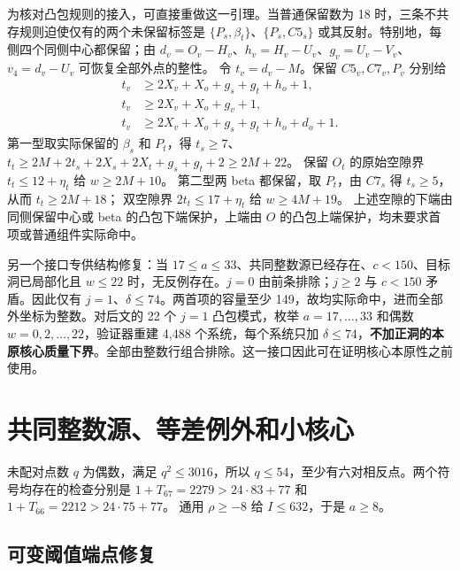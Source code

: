 \documentclass[11pt,a4paper]{article}
\begin{document}
为核对凸包规则的接入，可直接重做这一引理。当普通保留数为 18
时，三条不共存规则迫使仅有的两个未保留标签是
\(\{P_s,\beta_t\}\)、\(\{P_s,C5_s\}\)
或其反射。特别地，每侧四个同侧中心都保留；由
\(d_v=O_v-H_v\)、\(h_v=H_v-U_v\)、\(g_v=U_v-V_v\)、\(v_4=d_v-U_v\)
可恢复全部外点的整性。 令 \(t_v=d_v-M\)。保留 \(C5_v,C7_v,P_v\) 分别给
\[
\begin{aligned}
 t_v&\ge2X_v+X_o+g_s+g_t+h_o+1,\\
 t_v&\ge2X_v+X_o+g_v+1,\\
 t_v&\ge2X_v+X_o+g_s+g_t+h_o+d_o+1.
\end{aligned}
\] 第一型取实际保留的 \(\beta_s\) 和 \(P_t\)，得 \(t_s\ge7\)、
\(t_t\ge2M+2t_s+2X_s+2X_t+g_s+g_t+2\ge2M+22\)。 保留 \(O_t\)
的原始空隙界 \(t_t\le12+\eta_t\) 给 \(w\ge2M+10\)。 第二型两 beta
都保留，取 \(P_t\)，由 \(C7_s\) 得 \(t_s\ge5\)，从而 \(t_t\ge2M+18\)；
双空隙界 \(2t_t\le17+\eta_t\) 给 \(w\ge4M+19\)。
上述空隙的下端由同侧保留中心或 beta 的凸包下端保护，上端由 \(O\)
的凸包上端保护，均未要求首项或普通组件实际命中。

另一个接口专供结构修复：当
\(17\le a\le33\)、共同整数源已经存在、\(c<150\)、目标洞已局部化且
\(w\le22\) 时，无反例存在。\(j=0\) 由前条排除；\(j\ge2\) 与 \(c<150\)
矛盾。因此仅有 \(j=1\)、\(\delta\le74\)。两首项的容量至少
149，故均实际命中，进而全部外坐标为整数。对后文的 22 个 \(j=1\)
凸包模式，枚举 \(a=17,\ldots,33\) 和偶数 \(w=0,2,\ldots,22\)，验证器重建
4,488 个系统，每个系统只加
\(\delta\le74\)，\textbf{不加正洞的本原核心质量下界}。全部由整数行组合排除。这一接口因此可在证明核心本原性之前使用。

\hypertarget{ux5171ux540cux6574ux6570ux6e90ux7b49ux5deeux4f8bux5916ux548cux5c0fux6838ux5fc3}{%
\section{共同整数源、等差例外和小核心}\label{ux5171ux540cux6574ux6570ux6e90ux7b49ux5deeux4f8bux5916ux548cux5c0fux6838ux5fc3}}

未配对点数 \(q\) 为偶数，满足 \(q^2\le3016\)，所以
\(q\le54\)，至少有六对相反点。两个符号均存在的检查分别是
\(1+T_{67}=2279>24\cdot83+77\) 和 \(1+T_{66}=2212>24\cdot75+77\)。 通用
\(\rho\ge-8\) 给 \(I\le632\)，于是 \(a\ge8\)。

\hypertarget{ux53efux53d8ux9608ux503cux7aefux70b9ux4feeux590d}{%
\subsection{可变阈值端点修复}\label{ux53efux53d8ux9608ux503cux7aefux70b9ux4feeux590d}}
\end{document}
